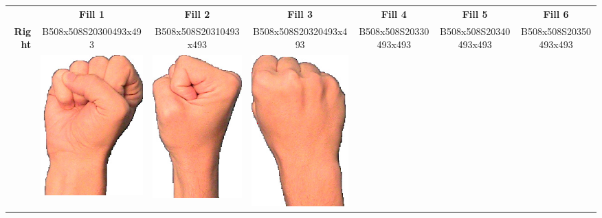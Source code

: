\documentclass{article}
\begin{document}
\begin{center}
\begin{tabular}{r*{6}{c}}
&\textbf{Fill 1}&\textbf{Fill 2}&\textbf{Fill 3}&\textbf{Fill 4}&\textbf{Fill 5}&\textbf{Fill 6}\\
\multirow{2}{*}{\textbf{Right}}&
B508x508S20300493x493&
B508x508S20310493x493&
B508x508S20320493x493&
B508x508S20330493x493&
B508x508S20340493x493&
B508x508S20350493x493\\
&
\includegraphics[scale=0.1]{images/10-06-1.jpg}&
\includegraphics[scale=0.1]{images/10-06-2.jpg}&
\includegraphics[scale=0.1]{images/10-06-3.jpg}&

\end{tabular}
\end{center}
\end{document}
